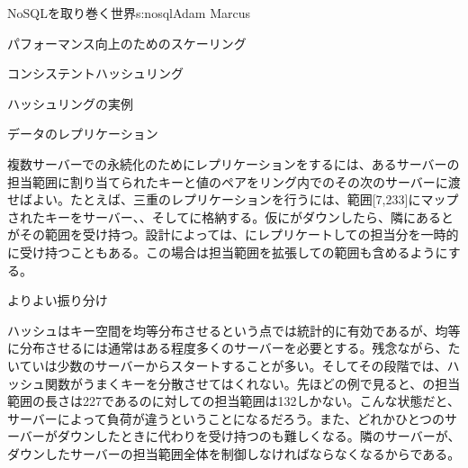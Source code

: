 \begin{aosachapter}{NoSQLを取り巻く世界}{s:nosql}{Adam Marcus}
\begin{aosasect1}{パフォーマンス向上のためのスケーリング}
\begin{aosasect2}{コンシステントハッシュリング}
\begin{aosasect3}{ハッシュリングの実例}
\end{aosasect3}

\begin{aosasect3}{データのレプリケーション}

複数サーバーでの永続化のためにレプリケーションをするには、あるサーバーの担当範囲に割り当てられたキーと値のペアをリング内でのその次のサーバーに渡せばよい。たとえば、三重のレプリケーションを行うには、範囲[7,233]にマップされたキーをサーバー、、そしてに格納する。仮にがダウンしたら、隣にあるとがその範囲を受け持つ。設計によっては、にレプリケートしての担当分を一時的に受け持つこともある。この場合は担当範囲を拡張しての範囲も含めるようにする。

\end{aosasect3}

\begin{aosasect3}{よりよい振り分け}

ハッシュはキー空間を均等分布させるという点では統計的に有効であるが、均等に分布させるには通常はある程度多くのサーバーを必要とする。残念ながら、たいていは少数のサーバーからスタートすることが多い。そしてその段階では、ハッシュ関数がうまくキーを分散させてはくれない。先ほどの例で見ると、の担当範囲の長さは227であるのに対しての担当範囲は132しかない。こんな状態だと、サーバーによって負荷が違うということになるだろう。また、どれかひとつのサーバーがダウンしたときに代わりを受け持つのも難しくなる。隣のサーバーが、ダウンしたサーバーの担当範囲全体を制御しなければならなくなるからである。


\end{aosasect3}
\end{aosasect2}
\end{aosasect1}
\end{aosachapter}

